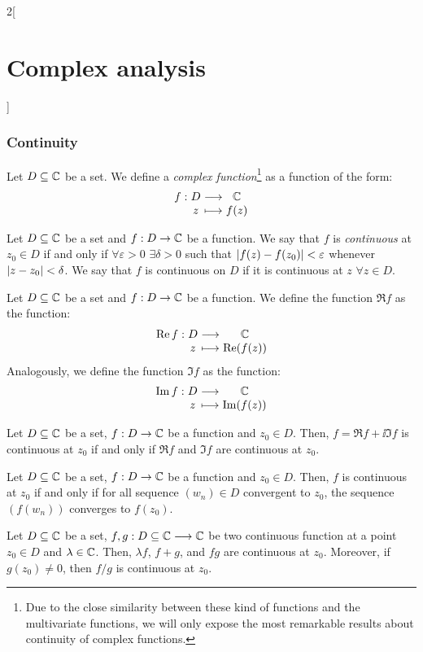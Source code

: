 \documentclass[../../../main_math.tex]{subfiles}
\begin{document}
\begin{multicols}{2}[\section{Complex analysis}]
  \subsubsection{Continuity}
  \begin{definition}
    Let $D \subseteq \mathbb{C}$ be a set. We define a \emph{complex function}\footnote{Due to the close similarity between these kind of functions and the multivariate functions, we will only expose the most remarkable results about continuity of complex functions.} as a function of the form:
    $$\function{f}{D}{\CC}{z}{f(z)}$$
  \end{definition}
  \begin{definition}
    Let $D \subseteq \mathbb{C}$ be a set and $f:D\rightarrow\mathbb{C}$ be a function. We say that $f$ is \emph{continuous} at $z_0\in D$ if and only if $\forall \varepsilon>0$ $\exists\delta>0$ such that $\abs{f(z)-f(z_0)}<\varepsilon$ whenever $\abs{z-z_0}<\delta$. We say that $f$ is continuous on $D$ if it is continuous at $z$ $\forall z\in D$.
  \end{definition}
  \begin{definition}
    Let $D \subseteq \mathbb{C}$ be a set and $f:D\rightarrow\mathbb{C}$ be a function. We define the function $\Re f$ as the function: $$\function{\Re f}{D}{\CC}{z}{\Re(f(z))}$$
    Analogously, we define the function $\Im f$ as the function: $$\function{\Im f}{D}{\CC}{z}{\Im(f(z))}$$
  \end{definition}
  \begin{proposition}
    Let $D \subseteq \mathbb{C}$ be a set, $f:D\rightarrow\mathbb{C}$ be a function and $z_0 \in D$. Then, $f = \Re f + \ii \Im f$ is continuous at $z_0$ if and only if $\Re f$ and $\Im f$ are continuous at $z_0$.
  \end{proposition}
  \begin{proposition}
    Let $D \subseteq \mathbb{C}$ be a set, $f:D\rightarrow\mathbb{C}$ be a function and $z_0 \in D$. Then, $f$ is continuous at $z_0$ if and only if for all sequence $(w_n)\in D$ convergent to $z_0$, the sequence $(f(w_n))$ converges to $f(z_0)$.
  \end{proposition}
  \begin{proposition}
    Let $D \subseteq \mathbb{C}$ be a set, $f,g:D \subseteq \mathbb{C} \longrightarrow \mathbb{C}$ be two continuous function at a point $z_0 \in D$ and $\lambda \in \mathbb{C}$. Then, $\lambda f$, $f+g$, and $fg$ are continuous at $z_0$. Moreover, if $g(z_0) \neq 0$, then $f/g$ is continuous at $z_0$.
  \end{proposition}

\end{multicols}
\end{document}

